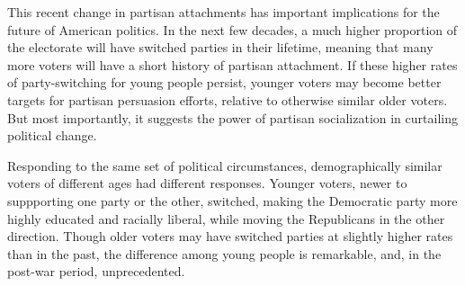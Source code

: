 \documentclass[11pt]{scrartcl}\usepackage[]{graphicx}\usepackage[]{color}
\begin{document}
This recent change in partisan attachments has important implications for the future of American politics. In the next few decades, a much higher proportion of the electorate will have switched parties in their lifetime, meaning that many more voters will have a short history of partisan attachment. If these higher rates of party-switching for young people persist, younger voters may become better targets for partisan persuasion efforts, relative to otherwise similar older voters.  But most importantly, it suggests the power of partisan socialization in curtailing political change. 

Responding to the same set of political circumstances,  demographically similar voters of different ages had different responses. Younger voters, newer to suppporting one party or the other, switched, making the Democratic party more highly educated and racially liberal, while moving the Republicans in the other direction. Though older voters may have switched parties at slightly higher rates than in the past, the difference among young people is remarkable, and, in the post-war period, unprecedented. 


\end{document}
